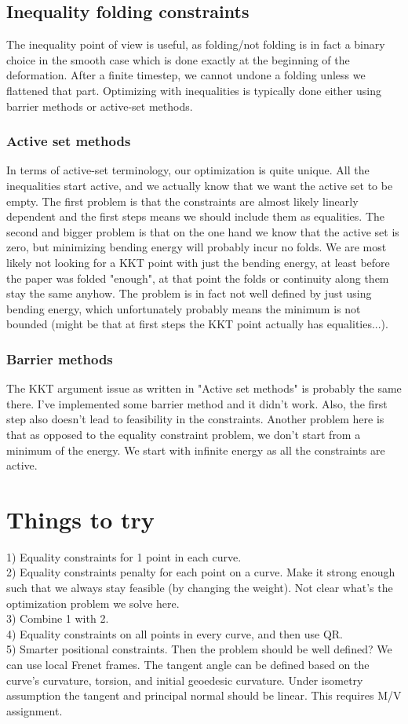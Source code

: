 \documentclass{article}
\theoremstyle{definition}
\begin{document}
\subsection{Inequality folding constraints}
The inequality point of view is useful, as folding/not folding is in fact a binary choice in the smooth case which is done exactly at the beginning of the deformation. After a finite timestep, we cannot undone a folding unless we flattened that part. Optimizing with inequalities is typically done either using barrier methods or active-set methods. 
\subsubsection{Active set methods}
In terms of active-set terminology, our optimization is quite unique. All the inequalities start active, and we actually know that we want the active set to be empty. The first problem is that the constraints are almost likely linearly dependent and the first steps means we should include them as equalities. The second and bigger problem is that on the one hand we know that the active set is zero, but minimizing bending energy will probably incur no folds. We are most likely not looking for a KKT point with just the bending energy, at least before the paper was folded "enough", at that point the folds or continuity along them stay the same anyhow. The problem is in fact not well defined by just using bending energy, which unfortunately probably means the minimum is not bounded (might be that at first steps the KKT point actually has equalities...).

\subsubsection{Barrier methods}
The KKT argument issue as written in "Active set methods" is probably the same there. I've implemented some barrier method and it didn't work. Also, the first step also doesn't lead to feasibility in the constraints. Another problem here is that as opposed to the equality constraint problem, we don't start from a minimum of the energy. We start with infinite energy as all the constraints are active.

\section{Things to try}
1) Equality constraints for 1 point in each curve.\\
2) Equality constraints penalty for each point on a curve. Make it strong enough such that we always stay feasible (by changing the weight). Not clear what's the optimization problem we solve here. \\
3) Combine 1 with 2. \\
4) Equality constraints on all points in every curve, and then use QR. \\
5) Smarter positional constraints. Then the problem should be well defined? We can use local Frenet frames. The tangent angle can be defined based on the curve's curvature, torsion, and initial geoedesic curvature. Under isometry assumption the tangent and principal normal should be linear. This requires M/V assignment.


%
%
\end{document}

